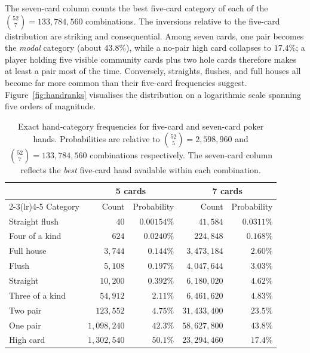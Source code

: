 The seven-card column counts the best five-card category of each of the $\binom{52}{7} = 133{,}784{,}560$ combinations. The inversions relative to the five-card distribution are striking and consequential. Among seven cards, one pair becomes the \emph{modal} category (about $43.8\%$), while a no-pair high card collapses to $17.4\%$; a player holding five visible community cards plus two hole cards therefore makes at least a pair most of the time. Conversely, straights, flushes, and full houses all become far more common than their five-card frequencies suggest. Figure~\ref{fig:handranks} visualises the distribution on a logarithmic scale spanning five orders of magnitude.

\begin{table}[!t]
\centering
\small
\renewcommand{\arraystretch}{1.32}
\setlength{\tabcolsep}{9pt}
\caption{Exact hand-category frequencies for five-card and seven-card poker hands. Probabilities are relative to $\binom{52}{5}=2{,}598{,}960$ and $\binom{52}{7}=133{,}784{,}560$ combinations respectively. The seven-card column reflects the \emph{best} five-card hand available within each combination.}
\label{tab:ranks}
\begin{tabular}{lrrrr}
\toprule
& \multicolumn{2}{c}{5 cards} & \multicolumn{2}{c}{7 cards} \\
\cmidrule(lr){2-3}\cmidrule(lr){4-5}
Category & Count & Probability & Count & Probability \\
\midrule
Straight flush & $40$ & $0.00154\%$ & $41{,}584$ & $0.0311\%$ \\
Four of a kind & $624$ & $0.0240\%$ & $224{,}848$ & $0.168\%$ \\
Full house & $3{,}744$ & $0.144\%$ & $3{,}473{,}184$ & $2.60\%$ \\
Flush & $5{,}108$ & $0.197\%$ & $4{,}047{,}644$ & $3.03\%$ \\
Straight & $10{,}200$ & $0.392\%$ & $6{,}180{,}020$ & $4.62\%$ \\
Three of a kind & $54{,}912$ & $2.11\%$ & $6{,}461{,}620$ & $4.83\%$ \\
Two pair & $123{,}552$ & $4.75\%$ & $31{,}433{,}400$ & $23.5\%$ \\
One pair & $1{,}098{,}240$ & $42.3\%$ & $58{,}627{,}800$ & $43.8\%$ \\
High card & $1{,}302{,}540$ & $50.1\%$ & $23{,}294{,}460$ & $17.4\%$ \\
\bottomrule
\end{tabular}
\end{table}

